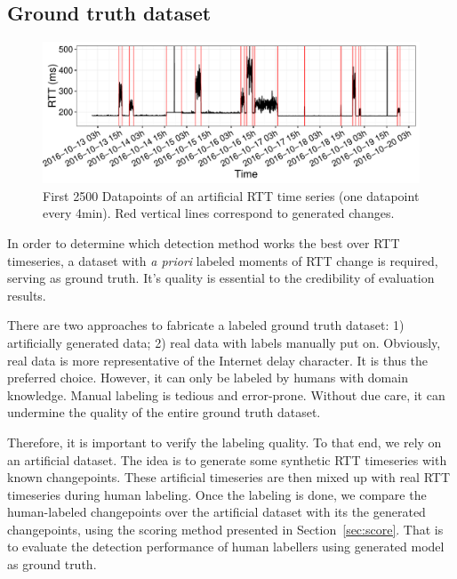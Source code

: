 \subsection{Ground truth dataset}
\label{sec:label}

\begin{figure}[!htb]
\centering
\includegraphics[width=.96\textwidth]{gfx/chap4/artificial_trace.pdf}
\caption{First 2500 %
Datapoints of an artificial RTT time series (one datapoint every 4min). 
Red vertical lines correspond to generated changes.}
\label{fig:art_example}
\end{figure}

In order to determine which detection method works the best over RTT timeseries, 
a dataset with \textit{a priori} labeled moments of RTT change is required, serving as ground truth.
It's quality is essential to the credibility of evaluation results.

There are two approaches to fabricate a labeled ground truth dataset: 1) artificially generated data; 2) real data with labels manually put on.
Obviously, real data is more representative of the Internet delay character.
It is thus the preferred choice.
However, it can only be labeled by humans with domain knowledge.
Manual labeling is tedious and error-prone.
Without due care, it can undermine the quality of the entire ground truth dataset.

Therefore, it is important to verify the labeling quality.
To that end, we rely on an artificial dataset.
The idea is to generate some synthetic RTT timeseries with known changepoints.
These artificial timeseries are then mixed up with real RTT timeseries during human labeling.
Once the labeling is done, we compare the human-labeled changepoints over the artificial dataset with its the generated changepoints, using the scoring method presented in Section~\ref{sec:score}.
That is to evaluate the detection performance of human labellers using generated model as ground truth.

